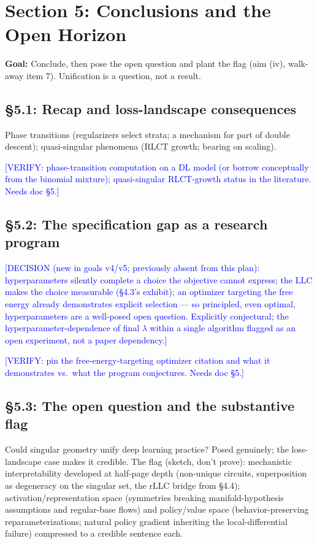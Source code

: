 \documentclass[11pt]{article}
\newcommand{\tagg}[1]{\textcolor{blue}{[#1]}}
\begin{document}
\section{Section 5: Conclusions and the Open Horizon}

\textbf{Goal:} Conclude, then pose the open question and plant the flag
(aim (iv), walk-away item 7). Unification is a question, not a result.

\subsection*{\S5.1: Recap and loss-landscape consequences}

Phase transitions (regularizers select strata; a mechanism for part of
double descent); quasi-singular phenomena (RLCT growth; bearing on
scaling).

\tagg{VERIFY: phase-transition computation on a DL model (or borrow
conceptually from the binomial mixture); quasi-singular RLCT-growth
status in the literature. Needs doc \S5.}

\subsection*{\S5.2: The specification gap as a research program}

\tagg{DECISION (new in goals v4/v5; previously absent from this plan):
hyperparameters silently complete a choice the objective cannot express;
the LLC makes the choice measurable (\S4.3's exhibit); an optimizer
targeting the free energy already demonstrates explicit selection ---
so principled, even optimal, hyperparameters are a well-posed open
question. Explicitly conjectural; the hyperparameter-dependence of
final $\lambda$ within a single algorithm flagged as an open
experiment, not a paper dependency.}

\tagg{VERIFY: pin the free-energy-targeting optimizer citation and what
it demonstrates vs.\ what the program conjectures. Needs doc \S5.}

\subsection*{\S5.3: The open question and the substantive flag}

Could singular geometry unify deep learning practice? Posed genuinely;
the loss-landscape case makes it credible. The flag (sketch, don't
prove): mechanistic interpretability developed at half-page depth
(non-unique circuits, superposition as degeneracy on the singular set,
the rLLC bridge from \S4.4); activation/representation space
(symmetries breaking manifold-hypothesis assumptions and regular-base
flows) and policy/value space (behavior-preserving reparameterizations;
natural policy gradient inheriting the local-differential failure)
compressed to a credible sentence each.
\end{document}

